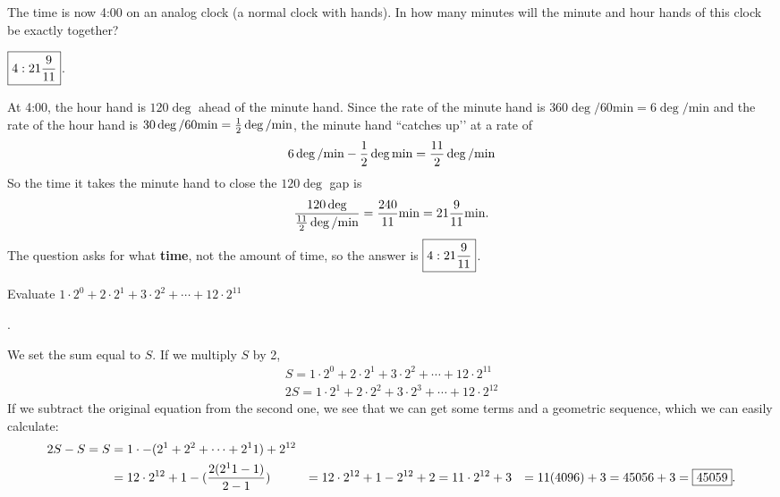 \documentclass[11pt]{article}
\DeclareRobustCommand{\frac}[3][0pt]{%
  {\begingroup\hspace{#1}#2\hspace{#1}\endgroup\over\hspace{#1}#3\hspace{#1}}}
\begin{document}
\begin{problem}The time is now 4:00 on an analog clock (a normal clock with hands). In how many minutes will the minute and hour hands of this clock be exactly together? %
\end{problem}

\begin{answer}
$\boxed{4:21 \frac{9}{11}}$.
\end{answer}
\begin{solution}
At 4:00, the hour hand is $120 \deg$ ahead of the minute hand. Since the rate of the minute hand is $360 \deg / 60 \text{min} = 6 \deg / \text{min}$ and the rate of the hour hand is $30 \deg / 60 \text{min}= \frac{1}{2} \deg / \text{min}$, the minute hand ``catches up’’ at a rate of 
$$6 \deg / \text{min}-\frac{1}{2} \deg \text{min} = \frac{11}{2} \deg / \text{min}$$
So the time it takes the minute hand to close the $120 \deg$ gap is
$$\frac{120 \deg}{\frac{11}{2} \deg / \text{min}} = \frac{240}{11} \text{min} = 21 \frac{9}{11} \text{min}.$$
The question asks for what \textbf{time}, not the amount of time, so the answer is $\boxed{4:21 \frac{9}{11}}$.
\end{solution}

\begin{problem}Evaluate $1\cdot2^{0} + 2\cdot2^1 + 3\cdot2^2 +\cdots+12\cdot2^{11}$
\end{problem}

\begin{answer}
.
\end{answer}
\begin{solution}
We set the sum equal to $S$. If we multiply $S$ by 2, 
\begin{align*}
S = 1\cdot2^{0} + 2\cdot2^1 + 3\cdot2^2 +\cdots+12\cdot2^{11} \\
2S = 1\cdot2^{1} + 2\cdot2^2 + 3\cdot2^3 +\cdots+12\cdot2^{12}
\end{align*}
If we subtract the original equation from the second one, we see that we can get some terms and a geometric sequence, which we can easily calculate:
\begin{align*}
2S-S=S &=1 \cdot - (2^1+2^2+\cdots+2^11)+2^{12} \\
&= 12\cdot 2^{12}+1 - (\frac{2(2^11-1)}{2-1})
&= 12\cdot 2^{12}+1-2^{12}+2
&= 11 \cdot 2^{12} +3
&= 11(4096) +3 = 45056+3 = \boxed{45059}.
\end{align*}
\end{solution}
\end{document}
